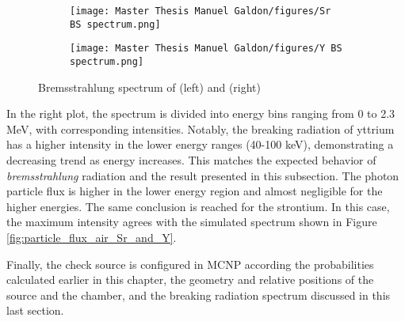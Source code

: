 \begin{figure}[!h]
    \begin{subfigure}{6 cm}
        \texttt{[image: Master Thesis Manuel Galdon/figures/Sr BS spectrum.png]} 
        \label{fig:Sr BS spectrum}
    \end{subfigure}
    \hspace{1cm}
    \begin{subfigure}{1 cm}
        \texttt{[image: Master Thesis Manuel Galdon/figures/Y BS spectrum.png]}
        \label{fig:Y BS spectrum}
    \end{subfigure}
    \caption{Bremsstrahlung spectrum of  (left) and  (right)}
    \label{fig:spectrum of Sr and Y}
\end{figure}

In the right plot, the spectrum is divided into energy bins ranging from 0 to 2.3 \unit{\mega\electronvolt}, with corresponding intensities. Notably, the breaking radiation of yttrium has a higher intensity in the lower energy ranges (40-100 \unit{\kilo\electronvolt}), demonstrating a decreasing trend as energy increases. This matches the expected behavior of \emph{bremsstrahlung} radiation and the result presented in this subsection. The photon particle flux is higher in the lower energy region and almost negligible for the higher energies. The same conclusion is reached for the strontium. In this case, the maximum intensity agrees with the simulated spectrum shown in Figure \ref{fig:particle_flux_air_Sr_and_Y}.%


Finally, the check source is configured in MCNP according the probabilities calculated earlier in this chapter, the geometry and relative positions of the source and the chamber, and the breaking radiation spectrum discussed in this last section. 